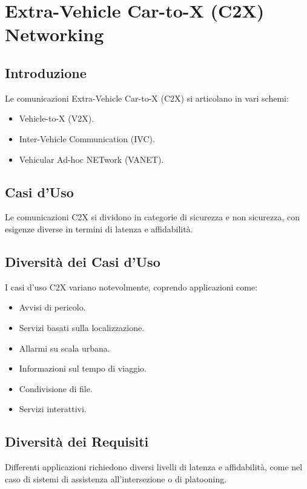 \section{Extra-Vehicle Car-to-X (C2X) Networking}

\subsection{Introduzione}
Le comunicazioni Extra-Vehicle Car-to-X (C2X) si articolano in vari schemi:
\begin{itemize}
    \item Vehicle-to-X (V2X).
    \item Inter-Vehicle Communication (IVC).
    \item Vehicular Ad-hoc NETwork (VANET).
\end{itemize}

\subsection{Casi d'Uso}
Le comunicazioni C2X si dividono in categorie di sicurezza e non sicurezza, con esigenze diverse in termini di latenza e affidabilità.

\subsection{Diversità dei Casi d'Uso}
I casi d'uso C2X variano notevolmente, coprendo applicazioni come:
\begin{itemize}
    \item Avvisi di pericolo.
    \item Servizi basati sulla localizzazione.
    \item Allarmi su scala urbana.
    \item Informazioni sul tempo di viaggio.
    \item Condivisione di file.
    \item Servizi interattivi.
\end{itemize}

\subsection{Diversità dei Requisiti}
Differenti applicazioni richiedono diversi livelli di latenza e affidabilità, come nel caso di sistemi di assistenza all'intersezione o di platooning.

